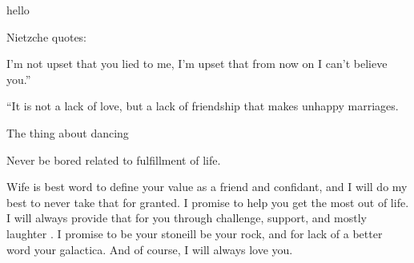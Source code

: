 \documentclass{letter}
\begin{document}
    
    hello

    Nietzche quotes:

    I'm not upset that you lied to me, I'm upset that from now on I can't believe you.” 

“It is not a lack of love, but a lack of friendship that makes unhappy marriages.

The thing about dancing


Never be bored related to fulfillment of life.

Wife is best word to define your value as a friend and confidant, and I will do my best to never
take that for granted. I promise to help you get the most out of life.  I will always provide that for you through challenge, support, and mostly laughter .  I promise to be your stoneill be your rock, and for lack of a better word your galactica. 
And of course, I will always love you.
\end{document}
